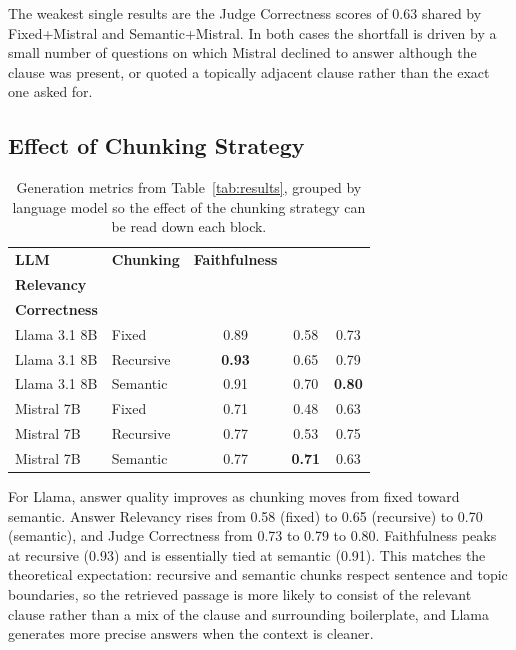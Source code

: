 The weakest single results are the Judge Correctness scores of 0.63 shared by Fixed+Mistral and Semantic+Mistral. In both cases the shortfall is driven by a small number of questions on which Mistral declined to answer although the clause was present, or quoted a topically adjacent clause rather than the exact one asked for.

\subsection{Effect of Chunking Strategy}

\begin{table}[ht]
\centering
\begin{tabular}{llccc}
\toprule
\textbf{LLM} & \textbf{Chunking} & \textbf{Faithfulness}
  & \makecell{\textbf{Answer}\\\textbf{Relevancy}}
  & \makecell{\textbf{Judge}\\\textbf{Correctness}} \\
\midrule
Llama 3.1 8B & Fixed     & 0.89 & 0.58 & 0.73 \\
Llama 3.1 8B & Recursive & \textbf{0.93} & 0.65 & 0.79 \\
Llama 3.1 8B & Semantic  & 0.91 & 0.70 & \textbf{0.80} \\
\midrule
Mistral 7B   & Fixed     & 0.71 & 0.48 & 0.63 \\
Mistral 7B   & Recursive & 0.77 & 0.53 & 0.75 \\
Mistral 7B   & Semantic  & 0.77 & \textbf{0.71} & 0.63 \\
\bottomrule
\end{tabular}
\caption{Generation metrics from Table~\ref{tab:results}, grouped by language model so the effect of the chunking strategy can be read down each block.}
\label{tab:excerpt-chunking}
\end{table}

For Llama, answer quality improves as chunking moves from fixed toward semantic. Answer Relevancy rises from 0.58 (fixed) to 0.65 (recursive) to 0.70 (semantic), and Judge Correctness from 0.73 to 0.79 to 0.80. Faithfulness peaks at recursive (0.93) and is essentially tied at semantic (0.91). This matches the theoretical expectation: recursive and semantic chunks respect sentence and topic boundaries, so the retrieved passage is more likely to consist of the relevant clause rather than a mix of the clause and surrounding boilerplate, and Llama generates more precise answers when the context is cleaner.

